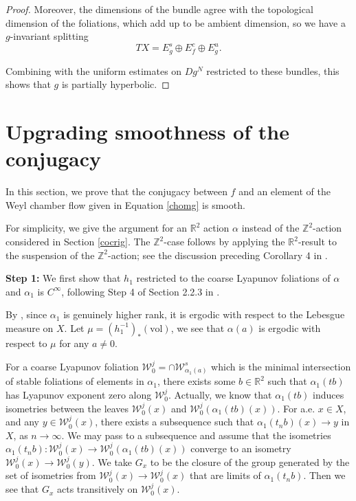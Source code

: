 \documentclass[11pt]{amsart}
\numberwithin{equation}{section}
\newcommand{\R}{\mathbb{R}}
\newcommand{\Z}{\mathbb{Z}}
\newcommand{\W}{\mathcal{W}}
\theoremstyle{plain}
\begin{document}
\begin{proof}
\color{black}

Moreover, the dimensions of the bundle agree with the topological dimension of the foliations, which add up to be ambient dimension, so we have a $g$-invariant splitting $$TX=E^s_g\oplus E^c_f\oplus E^u_g.$$

Combining with the uniform estimates on $Dg^N$ restricted to these bundles, this shows that $g$ is partially hyperbolic.
\end{proof}

\appendix
\color{black}
\section{Upgrading smoothness of the conjugacy}\label{hsmooth}

In this section, we prove that the conjugacy between $f$ and an element of the Weyl chamber flow given in Equation \ref{chomg} is smooth. 

For simplicity, we give the argument for an $\R^2$ action $\alpha$ instead of the $\Z^2$-action considered in Section \ref{cocrig}. The $\Z^2$-case follows by applying the \(\mathbb R^2\)-result to the
suspension of the \(\mathbb Z^2\)-action; see the discussion preceding
Corollary 4 in \cite{KSpat}.


\textbf{Step 1:} We first show that $h_1$ restricted to the coarse Lyapunov foliations of $\alpha$ and $\alpha_1$ is $C^\infty$, following Step 4 of Section 2.2.3 in \cite{KSpat}.

By \cite[Theorem 3]{Moore}, since $\alpha_1$ is genuinely higher rank, it is ergodic with respect to the Lebesgue measure on $X$. Let $\mu=(h_1^{-1})_*(\mathrm{vol})$, we see that $\alpha(a)$ is ergodic with respect to $\mu$ for any $a\neq 0$.

For a coarse Lyapunov foliation $\W^j_0=\cap \W^s_{\alpha_1(a)}$ which is the minimal intersection of stable foliations of elements in $\alpha_1$, there exists some $b\in \R^2$ such that $\alpha_1(tb)$ has Lyapunov exponent zero along $\W^j_0$. Actually, we know that $\alpha_1(tb)$ induces isometries between the leaves $\W^j_0(x)$ and $\W^j_0(\alpha_1(tb)(x))$. For a.e. $x\in X$, and any $y\in \W^j_0(x)$, there exists a subsequence such that $\alpha_1(t_n b)(x)\to y$ in $X$, as $n\to \infty$. We may pass to a subsequence and assume that the isometries $\alpha_1(t_n b): \W^j_0(x)\to \W^j_0(\alpha_1(tb)(x))$ converge to an isometry $\W^j_0(x)\to \W^j_0(y)$. We take $G_x$ to be the closure of the group generated by the set of isometries from $\W^j_0(x)\to \W^j_0(x)$ that are limits of $\alpha_1(t_n b)$. Then we see that $G_x$ acts transitively on $\W^j_0(x)$.
\end{document}
